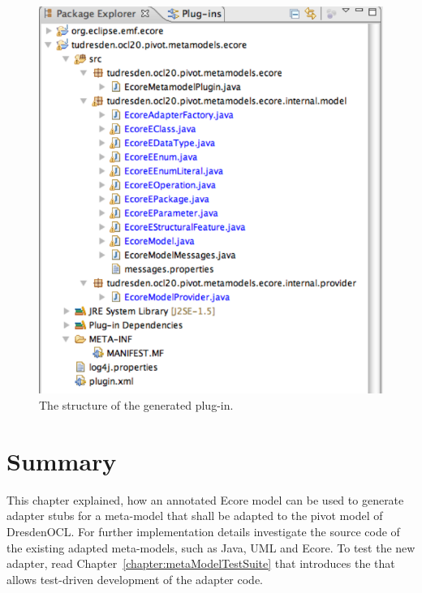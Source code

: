 \begin{figure}[!htbp]
	\centering
	\includegraphics[width=0.7\linewidth]{figures/pivotModelAdaption/GeneratedPlugin}
	\caption{The structure of the generated plug-in.}
	\label{pic:pivotModelAdaption:GeneratedPlugin}
\end{figure}



\section{Summary}

This chapter explained, how an annotated Ecore model can be used to generate 
adapter stubs for a meta-model that shall be adapted to the pivot model of
DresdenOCL. For further implementation details investigate the source code of
the existing adapted meta-models, such as Java, \acs{UML} and Ecore. To test 
the new adapter, read Chapter~\ref{chapter:metaModelTestSuite} that introduces 
the  that allows test-driven development 
of the adapter code.

